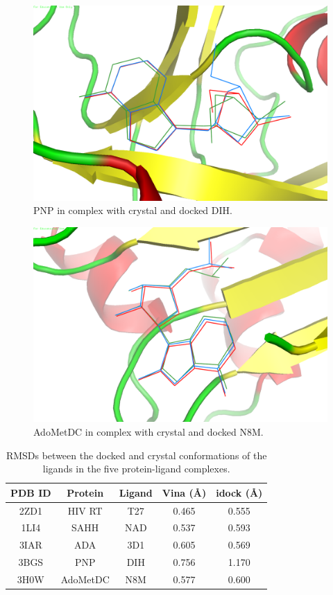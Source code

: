 \begin{figure}
\centering
\includegraphics[width=\textwidth]{VirtualScreening/Figures/3BGS-DIH.png}
\caption{PNP in complex with crystal and docked DIH.}
\label{fig:3BGS-DIH}
\end{figure}

\begin{figure}
\centering
\includegraphics[width=\textwidth]{VirtualScreening/Figures/3H0W-N8M.png}
\caption{AdoMetDC in complex with crystal and docked N8M.}
\label{fig:3H0W-N8M}
\end{figure}

\begin{table}
\centering
\begin{tabular*}
{\textwidth}
{@{\extracolsep{\fill}}ccccc}
\toprule
PDB ID & Protein & Ligand & Vina (\AA) & idock (\AA) \\
\midrule
2ZD1 & HIV RT      & T27  & 0.465 & 0.555\\
1LI4  & SAHH        & NAD & 0.537 & 0.593\\
3IAR  & ADA          & 3D1 & 0.605 & 0.569\\
3BGS & PNP           & DIH & 0.756 & 1.170\\
3H0W & AdoMetDC & N8M & 0.577 & 0.600\\
\bottomrule
\end{tabular*}
\caption{RMSDs between the docked and crystal conformations of the ligands in the five protein-ligand complexes.}
\label{tab:RMSD}
\end{table}

